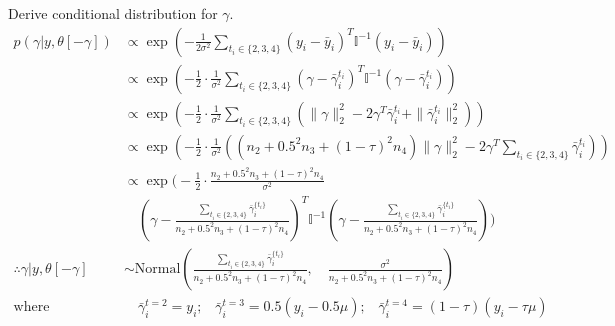 \documentclass[12pt,letterpaper,twoside]{article}
\begin{document}
Derive conditional distribution for $\gamma$.
\begin{align*}
    p(\gamma|y,\theta[-\gamma]) & \propto \exp\left(-\frac{1}{2\sigma^2} \sum_{t_i \in \{2,3,4\}} (y_i - \bar{y}_i)^T \mathbb{I}^{-1} (y_i - \bar{y}_i) \right) \\ %
        & \propto \exp\left(-\frac{1}{2} \cdot \frac{1}{\sigma^2} \sum_{t_i \in \{2,3,4\}} (\gamma - \bar{\gamma}_i^{t_i})^T \mathbb{I}^{-1} (\gamma - \bar{\gamma}_i^{t_i}) \right) \\ %
        & \propto \exp\left(-\frac{1}{2} \cdot \frac{1}{\sigma^2} \sum_{t_i \in \{2,3,4\}} \left(\|\gamma\|^2_2 - 2\gamma^T \bar{\gamma}_i^{t_i} + \|\bar{\gamma}_i^{t_i}\|^2_2 \right)\right) \\ %
        & \propto \exp\left(-\frac{1}{2} \cdot \frac{1}{\sigma^2} \left((n_2 + 0.5^2 n_3 + (1-\tau)^2 n_4)\|\gamma\|^2_2 - 2\gamma^T \sum_{t_i \in \{2,3,4\}} \bar{\gamma}_i^{t_i} \right)\right) \\ %
        & \propto \exp\biggl(-\frac{1}{2} \cdot \frac{n_2 + 0.5^2 n_3 + (1-\tau)^2 n_4}{\sigma^2} \\ %
        & \quad \left(\gamma - \frac{\sum_{t_i \in \{2,3,4\}} \bar{\gamma}_i^{\{t_i\}}}{n_2 + 0.5^2 n_3 + (1-\tau)^2 n_4} \right)^T \mathbb{I}^{-1} \left(\gamma - \frac{\sum_{t_i \in \{2,3,4\}} \bar{\gamma}_i^{\{t_i\}}}{n_2 + 0.5^2 n_3 + (1-\tau)^2 n_4} \right)\biggr) && \\
    \therefore \gamma | y, \theta[-\gamma] & \sim \text{Normal}\left( \frac{\sum_{t_i \in \{2,3,4\}} \bar{\gamma}_i^{\{t_i\}}}{n_2 + 0.5^2 n_3 + (1-\tau)^2 n_4}, \quad \frac{\sigma^2}{n_2 + 0.5^2 n_3 + (1-\tau)^2 n_4} \right) \\
    \text{where} & \quad \bar{\gamma}_i^{t=2} = y_i \text{;} \quad \bar{\gamma}_i^{t=3} = 0.5(y_i - 0.5\mu) \text{;} \quad \bar{\gamma}_i^{t=4} = (1-\tau) (y_i - \tau\mu)
\end{align*}
\end{document}

